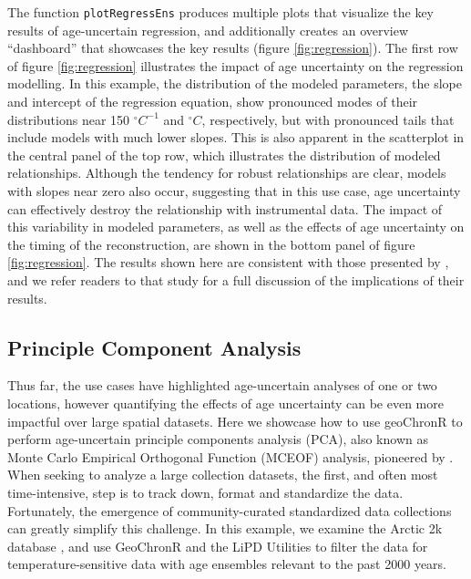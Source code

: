 \documentclass[gchron, manuscript]{copernicus}
\begin{document}
The function \texttt{plotRegressEns} produces multiple plots that visualize the key results of age-uncertain regression, and additionally creates an overview ``dashboard'' that showcases the key results (figure \ref{fig:regression}).
The first row of figure \ref{fig:regression} illustrates the impact of age uncertainty on the regression modelling.
In this example, the distribution of the modeled parameters, the slope and intercept of the regression equation, show pronounced modes of their distributions near 150 \(^\circ C^{-1}\) and \(^\circ C\), respectively, but with pronounced tails that include models with much lower slopes.
This is also apparent in the scatterplot in the central panel of the top row, which illustrates the distribution of modeled relationships.
Although the tendency for robust relationships are clear, models with slopes near zero also occur, suggesting that in this use case, age uncertainty can effectively destroy the relationship with instrumental data.
The impact of this variability in modeled parameters, as well as the effects of age uncertainty on the timing of the reconstruction, are shown in the bottom panel of figure \ref{fig:regression}.
The results shown here are consistent with those presented by \citet{Boldt:2015}, and we refer readers to that study for a full discussion of the implications of their results.

\hypertarget{sec:pca}{%
\subsection{Principle Component Analysis}\label{sec:pca}}

Thus far, the use cases have highlighted age-uncertain analyses of one or two locations, however quantifying the effects of age uncertainty can be even more impactful over large spatial datasets.
Here we showcase how to use geoChronR to perform age-uncertain principle components analysis (PCA), also known as Monte Carlo Empirical Orthogonal Function (MCEOF) analysis, pioneered by \citet{anchukaitis2013mceof}.
When seeking to analyze a large collection datasets, the first, and often most time-intensive, step is to track down, format and standardize the data.
Fortunately, the emergence of community-curated standardized data collections \citep[e.g.][\citet{Pages2017}, \citet{Temp12k}]{Pages2013} can greatly simplify this challenge.
In this example, we examine the Arctic 2k database \citep{McKayKaufman2014}, and use GeoChronR and the LiPD Utilities to filter the data for temperature-sensitive data with age ensembles relevant to the past 2000 years.
\end{document}
